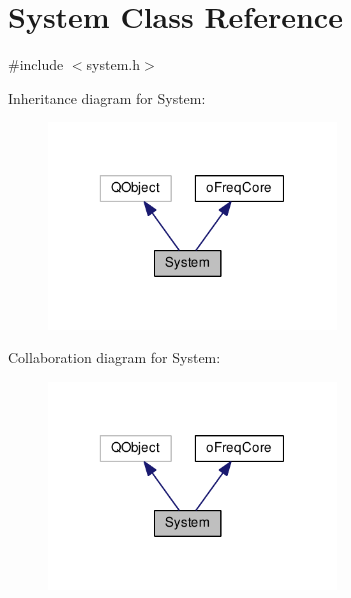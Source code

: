 \hypertarget{class_system}{\section{System Class Reference}
\label{class_system}
}


{\ttfamily \#include $<$system.\-h$>$}



Inheritance diagram for System\-:\nopagebreak
\begin{figure}[H]
\begin{center}
\leavevmode
\includegraphics[width=217pt]{class_system__inherit__graph}
\end{center}
\end{figure}


Collaboration diagram for System\-:\nopagebreak
\begin{figure}[H]
\begin{center}
\leavevmode
\includegraphics[width=217pt]{class_system__coll__graph}
\end{center}
\end{figure}
